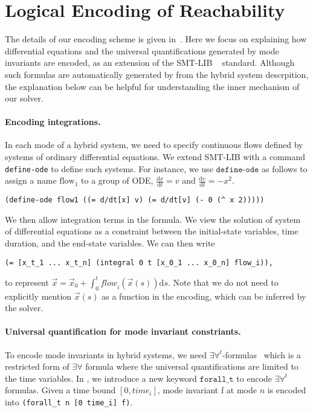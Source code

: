 \section{Logical Encoding of Reachability}


The details of our encoding scheme is given in~\cite{DBLP:journals/corr/GaoKCC14}.
Here we focus on explaining how differential equations and the universal quantifications
generated by mode invariants are encoded, as an extension of the SMT-LIB
~\cite{BarST-SMT-10} standard. Although such formulas are automatically generated by \dReach{}
from the hybrid system descrpition, the explanation below can be helpful for
understanding the inner mechanism of our solver.

\paragraph{Encoding integrations.}
In each mode of a hybrid system, we need to specify continuous flows defined
by systems of ordinary differential equations. We extend SMT-LIB with a command
\texttt{define-ode} to define such systems. For instance, we use $\texttt{define-ode}$ as follows to
assign a name $\mathrm{flow_1}$ to a group of ODE,
$\frac{\mathrm{d}x}{\mathrm{d}t} = v$ and
$\frac{\mathrm{d}v}{\mathrm{d}t} = -x^2$.
\begin{Verbatim}[fontfamily=courier, fontsize=\small]
(define-ode flow1 ((= d/dt[x] v) (= d/dt[v] (- 0 (^ x 2)))))
\end{Verbatim}
We then allow integration terms in the formula. We view the solution of system of differential equations
as a constraint between the initial-state variables, time duration, and the end-state variables. We can then write
\begin{Verbatim}[fontfamily=courier, fontsize=\small]
(= [x_t_1 ... x_t_n] (integral 0 t [x_0_1 ... x_0_n] flow_i)),
\end{Verbatim}
to represent
$\vec x = \vec x_0 + \int_0^t \mathit{flow}_i(\vec x(s))\mathrm{d}s$. Note that we do not need to explicitly mention $\vec x(s)$ as a function in the encoding, which can be inferred by the solver.

\paragraph{Universal quantification for mode invariant constriants.} To encode mode invariants in hybrid systems, we
need $\exists\forall^t$-formulas~\cite{DBLP:conf/fmcad/GaoKC13} which
is a restricted form of $\exists\forall$ formula where the universal
quantifications are limited to the time variables. In \drh{}, we
introduce a new keyword $\texttt{forall\_t}$ to encode
$\exists\forall^t$ formulas. Given a time bound $[0, time_i]$, mode
invariant f at mode $n$ is encoded into \texttt{(forall\_t n [0
  time\_i] f)}.

